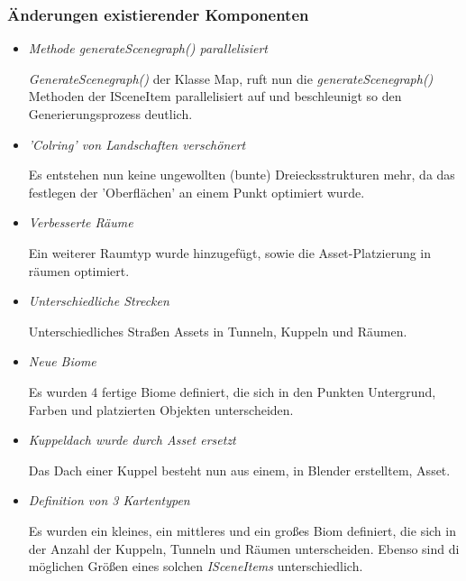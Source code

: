 \subsubsection{Änderungen existierender Komponenten}
\begin{itemize}
    \item \textit{Methode \textit{generateScenegraph()} parallelisiert}
        \begin{leftbar}[0.9\linewidth]
            \textit{GenerateScenegraph()} der Klasse Map, ruft nun die \textit{generateScenegraph()} Methoden
            der ISceneItem parallelisiert auf und beschleunigt so den Generierungsprozess deutlich.
        \end{leftbar}
    
    \item \textit{'Colring' von Landschaften verschönert}
        \begin{leftbar}[0.9\linewidth]
            Es entstehen nun keine ungewollten (bunte) Dreiecksstrukturen mehr, da das festlegen der 'Oberflächen'
            an einem Punkt optimiert wurde.
        \end{leftbar}

    \item \textit{Verbesserte Räume}
        \begin{leftbar}[0.9\linewidth]
            Ein weiterer Raumtyp wurde hinzugefügt, sowie die Asset-Platzierung in räumen optimiert.
        \end{leftbar}

    \item \textit{Unterschiedliche Strecken}
        \begin{leftbar}[0.9\linewidth]
            Unterschiedliches Straßen Assets in Tunneln, Kuppeln und Räumen.
        \end{leftbar}

    \item \textit{Neue Biome}
        \begin{leftbar}[0.9\linewidth]
            Es wurden 4 fertige Biome definiert, die sich in den Punkten Untergrund, Farben und platzierten Objekten
            unterscheiden.
        \end{leftbar}

    \item \textit{Kuppeldach wurde durch Asset ersetzt}
        \begin{leftbar}[0.9\linewidth]
            Das Dach einer Kuppel besteht nun aus einem, in Blender erstelltem, Asset.
        \end{leftbar}

    \item \textit{Definition von 3 Kartentypen}
        \begin{leftbar}[0.9\linewidth]
            Es wurden ein kleines, ein mittleres und ein großes Biom definiert, die sich in der Anzahl der Kuppeln, 
            Tunneln und Räumen unterscheiden. Ebenso sind di möglichen Größen eines solchen \textit{ISceneItems} unterschiedlich.
        \end{leftbar}
\end{itemize} 